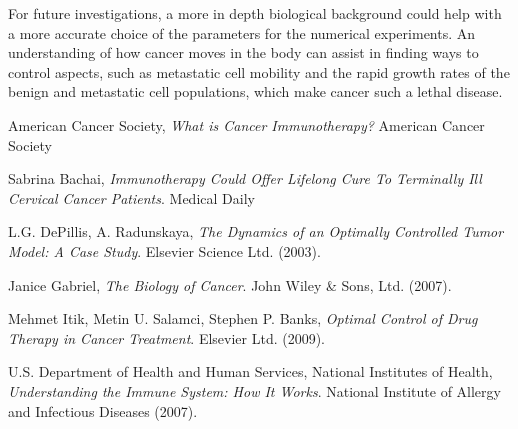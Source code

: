 \documentclass[letter,10pt]{article}
\begin{document}
For future investigations,  a more in depth biological background  could help with a more accurate  choice of the parameters for the numerical experiments.  An understanding of how cancer moves in the body can assist in finding ways to control aspects, such as metastatic cell mobility and the rapid growth rates of the benign and metastatic cell populations, which make cancer such a lethal disease. 

\begin{thebibliography}{cc}

 American Cancer Society, \emph{What is Cancer Immunotherapy?} American Cancer Society %

 Sabrina Bachai, \emph{Immunotherapy Could Offer Lifelong Cure To Terminally Ill Cervical Cancer Patients}. Medical Daily %

 L.G. DePillis, A. Radunskaya, \emph{The Dynamics of an Optimally Controlled Tumor Model: A Case Study}. Elsevier Science Ltd.
(2003).

 Janice Gabriel, \emph{The Biology of Cancer}. John Wiley \& Sons, Ltd.
(2007).

 Mehmet Itik, Metin U. Salamci, Stephen P. Banks, \emph{Optimal Control of Drug Therapy in Cancer Treatment}. Elsevier Ltd.
(2009).

 U.S. Department of Health and Human Services, National Institutes of Health, \emph{Understanding the Immune System: How It Works}. National Institute of Allergy and Infectious Diseases
(2007).



\end{thebibliography}
\end{document}
